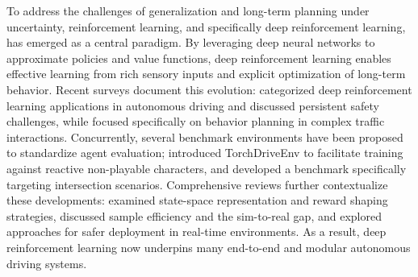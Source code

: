 \documentclass[sn-mathphys,Numbered]{sn-jnl}
\begin{document}
To address the challenges of generalization and long-term planning under uncertainty, reinforcement learning, and specifically deep reinforcement learning, has emerged as a central paradigm. By leveraging deep neural networks to approximate policies and value functions, deep reinforcement learning enables effective learning from rich sensory inputs and explicit optimization of long-term behavior. Recent surveys document this evolution: \citet{zhao2024survey} categorized deep reinforcement learning applications in autonomous driving and discussed persistent safety challenges, while \citet{wu2024survey} focused specifically on behavior planning in complex traffic interactions. Concurrently, several benchmark environments have been proposed to standardize agent evaluation; \citet{lavington2024torchdriveenv} introduced TorchDriveEnv to facilitate training against reactive non-playable characters, and \citet{liu2021rlbenchmark} developed a benchmark specifically targeting intersection scenarios. Comprehensive reviews further contextualize these developments: \citet{kiran2022deep} examined state-space representation and reward shaping strategies, \citet{prasuna2024deep} discussed sample efficiency and the sim-to-real gap, and \citet{singh2025improvised} explored approaches for safer deployment in real-time environments. As a result, deep reinforcement learning now underpins many end-to-end and modular autonomous driving systems.
\end{document}
